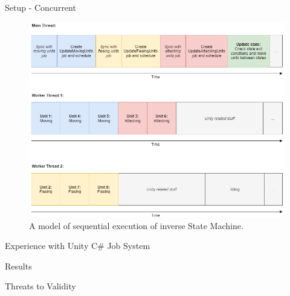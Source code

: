 \begin{frame}{\secname}{\subsecname}
	Setup - Concurrent
	\begin{figure}[h!]
        \centering
        \includegraphics[width=.7\textwidth]{pictures/concurrent.png}
        \caption{A model of sequential execution of inverse State Machine.}
    \end{figure}
\end{frame}

\begin{frame}{\secname}{\subsecname}
	Experience with Unity C\# Job System
\end{frame}

\begin{frame}{\secname}{\subsecname}
	Results
\end{frame}

\begin{frame}{\secname}{\subsecname}
	Threats to Validity
\end{frame}
